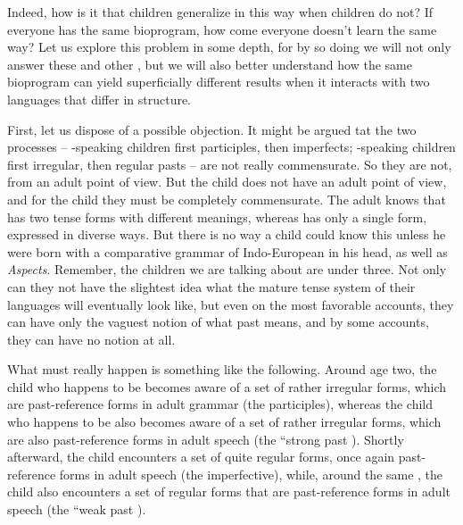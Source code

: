 Indeed, how is it that  children generalize in this way when  children do not? If everyone has the same bioprogram, how come everyone doesn't learn the same way? Let us explore this problem in some depth, for by so doing we will not only answer these and other , but we will also better understand how the same bioprogram can yield superficially different results when it interacts with two languages that differ in structure.

First, let us dispose of a possible objection. It might be argued tat the two processes -- -speaking children  first parti\-ciples, then imperfects; -speaking children  first irregular, then regular pasts -- are not really commensurate. So they are not, from an adult point of view. But the child does not have an adult point of view, and for the child they must be completely commensurate. The adult knows that  has two tense forms with different meanings, whereas  has only a single form, expressed in diverse ways. But there is no way a child could know this unless he were born with a comparative grammar of Indo-European in his head, as well as \textit{Aspects}. Remember, the children we are talking about are under three. Not only can they not have the slightest idea what the mature tense system of their languages will eventually look like, but even on the most favorable accounts, they can have only the vaguest notion of what past means, and by some accounts, they can have no notion at all.


What must really happen is something like the following. Around age two, the child who happens to be   becomes aware of a set of rather irregular forms, which are past-reference forms in adult grammar (the  participles), whereas the child who happens to be   also becomes aware of a set of rather irregular forms, which are also past-reference forms in adult speech (the  ``strong past ). Shortly afterward, the child   encounters a set of quite regular forms, once again past-reference forms in adult speech (the  imperfective), while, around the same , the child   also encounters a set of regular forms that are past-reference forms in adult speech (the  ``weak past ).

